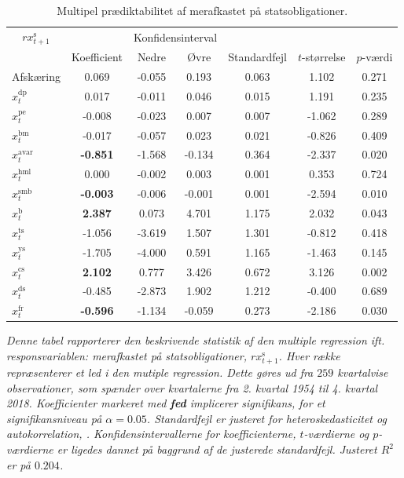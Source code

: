 \documentclass[
  a4paper,
  oneside]{memoir}
\begin{document}
\begin{table}[H]

\caption{\label{tab:MULT-s}Multipel prædiktabilitet af merafkastet på statsobligationer.}
\centering
\begin{threeparttable}
\begin{tabular}[t]{lcccccc}
\toprule
\multicolumn{1}{c}{$rx_{t+1}^{\text{s}}$} & \multicolumn{1}{c}{ } & \multicolumn{2}{c}{Konfidensinterval} & \multicolumn{3}{c}{ } \\
\cmidrule(l{3pt}r{3pt}){1-1} \cmidrule(l{3pt}r{3pt}){3-4}
  & Koefficient & Nedre & Øvre & Standardfejl & $t$-størrelse & $p$-værdi\\
\midrule
\rowcolor{gray!6}  Afskæring & 0.069 & -0.055 & 0.193 & 0.063 & 1.102 & 0.271\\
$x_t^{\text{dp}}$ & 0.017 & -0.011 & 0.046 & 0.015 & 1.191 & 0.235\\
\rowcolor{gray!6}  $x_t^{\text{pe}}$ & -0.008 & -0.023 & 0.007 & 0.007 & -1.062 & 0.289\\
$x_t^{\text{bm}}$ & -0.017 & -0.057 & 0.023 & 0.021 & -0.826 & 0.409\\
\rowcolor{gray!6}  $x_t^{\text{avar}}$ & \textbf{-0.851} & -1.568 & -0.134 & 0.364 & -2.337 & 0.020\\
$x_t^{\text{hml}}$ & 0.000 & -0.002 & 0.003 & 0.001 & 0.353 & 0.724\\
\rowcolor{gray!6}  $x_t^{\text{smb}}$ & \textbf{-0.003} & -0.006 & -0.001 & 0.001 & -2.594 & 0.010\\
$x_t^{\text{b}}$ & \textbf{ 2.387} & 0.073 & 4.701 & 1.175 & 2.032 & 0.043\\
\rowcolor{gray!6}  $x_t^{\text{ts}}$ & -1.056 & -3.619 & 1.507 & 1.301 & -0.812 & 0.418\\
$x_t^{\text{ys}}$ & -1.705 & -4.000 & 0.591 & 1.165 & -1.463 & 0.145\\
\rowcolor{gray!6}  $x_t^{\text{cs}}$ & \textbf{ 2.102} & 0.777 & 3.426 & 0.672 & 3.126 & 0.002\\
$x_t^{\text{ds}}$ & -0.485 & -2.873 & 1.902 & 1.212 & -0.400 & 0.689\\
\rowcolor{gray!6}  $x_t^{\text{fr}}$ & \textbf{-0.596} & -1.134 & -0.059 & 0.273 & -2.186 & 0.030\\
\bottomrule
\end{tabular}
\begin{tablenotes}
\item \textit{Denne tabel rapporterer den beskrivende statistik af den multiple regression ift. responsvariablen: merafkastet på statsobligationer, $rx_{t+1}^{\text{s}}$. Hver række repræsenterer et led i den mutiple regression. Dette gøres ud fra $259$ kvartalvise observationer, som spænder over kvartalerne fra 2. kvartal 1954 til 4. kvartal 2018. Koefficienter markeret med \textbf{fed} implicerer signifikans, for et signifikansniveau på $\alpha=0.05$. Standardfejl er justeret for heteroskedasticitet og autokorrelation, \citep{Newey1987}. Konfidensintervallerne for koefficienterne, $t$-værdierne og $p$-værdierne er ligedes dannet på baggrund af de justerede standardfejl. Justeret $R^2$ er på $0.204$.}
\end{tablenotes}
\end{threeparttable}
\end{table}
\end{document}
